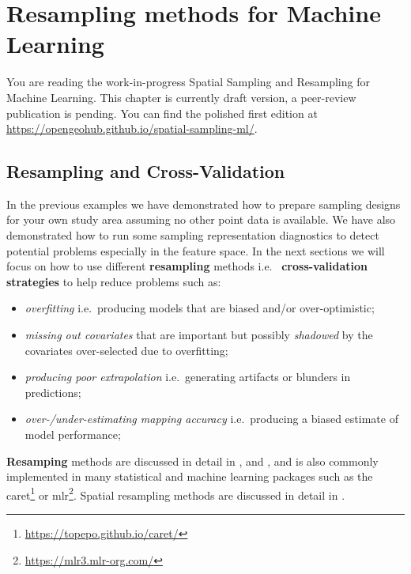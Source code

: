 \documentclass[
  graybox,natbib,nospthms]{svmono}
\providecommand{\tightlist}{%
  \setlength{\itemsep}{0pt}\setlength{\parskip}{0pt}}
\providecommand{\tightlist}{\setlength{\itemsep}{0pt}\setlength{\parskip}{0pt}}
\renewcommand{\href}[2]{#2 (\url{#1})}
\renewcommand{\href}[2]{#2\footnote{\url{#1}}}
\begin{document}
\hypertarget{resampling-methods-for-machine-learning}{%
\chapter{Resampling methods for Machine Learning}\label{resampling-methods-for-machine-learning}}

You are reading the work-in-progress Spatial Sampling and Resampling for Machine Learning. This chapter is currently draft version, a peer-review publication is pending. You can find the polished first edition at \url{https://opengeohub.github.io/spatial-sampling-ml/}.

\hypertarget{resampling-and-cross-validation}{%
\section{Resampling and Cross-Validation}\label{resampling-and-cross-validation}}

In the previous examples we have demonstrated how to prepare sampling designs
for your own study area assuming no other point data is available. We have also
demonstrated how to run some sampling representation diagnostics to detect potential
problems especially in the feature space. In the next sections we will focus on
how to use different \textbf{resampling} methods i.e.~
\textbf{cross-validation strategies} \citep{roberts2017cross} to help reduce problems such as:

\begin{itemize}
\tightlist
\item
  \emph{overfitting} i.e.~producing models that are biased and/or over-optimistic;\\
\item
  \emph{missing out covariates} that are important but possibly \emph{shadowed} by the covariates
  over-selected due to overfitting;\\
\item
  \emph{producing poor extrapolation} i.e.~generating artifacts or blunders in predictions;\\
\item
  \emph{over-/under-estimating mapping accuracy} i.e.~producing a biased estimate of model performance;
\end{itemize}

\textbf{Resamping} methods are discussed in detail in \citet{hastie2009elements}, \citet{kuhn2013applied} and
\citet{roberts2017cross}, and is also commonly implemented in many statistical and machine
learning packages such as the \href{https://topepo.github.io/caret/}{caret} or \href{https://mlr3.mlr-org.com/}{mlr}.
Spatial resampling methods are discussed in detail in \citet{lovelace2019geocomputation}.
\end{document}
